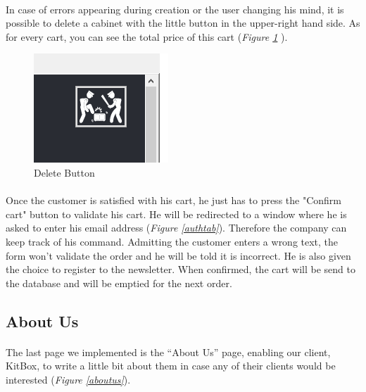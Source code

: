 \documentclass[12pt,oneside]{report}
\begin{document}
        \paragraph{}
        In case of errors appearing during creation or the user changing his mind, it is possible to delete a cabinet with the little button in the upper-right hand side. As for every cart, you can see the total price of this cart (\textit{Figure \ref{deleteButton}} ).
        \vspace{\baselineskip}
        
        \begin{figure}[h!]
            \centering
    		\includegraphics[scale=0.5]{Figures/DeleteButton.PNG}
    		\caption{Delete Button}
    		\label{deleteButton}
    	\end{figure}

    	\paragraph{}
        Once the customer is satisfied with his cart, he just has to press the "Confirm cart" button to validate his cart. He will be redirected to a window where he is asked to enter his email address (\textit{Figure \ref{authtab}}). Therefore the company can keep track of his command. Admitting the customer enters a wrong text, the form won’t validate the order and he will be told it is incorrect. He is also given the choice to register to the newsletter. When confirmed, the cart will be send to the database and will be emptied for the next order.
    \vspace{\baselineskip}
    \vspace{\baselineskip}
       
    \subsection{About Us}
        \paragraph{}
        The last page we implemented is the “About Us” page, enabling our client, KitBox, to write a little bit about them in case any of their clients would be interested (\textit{Figure \ref{aboutus}}).
        \vspace{\baselineskip}
\end{document}
